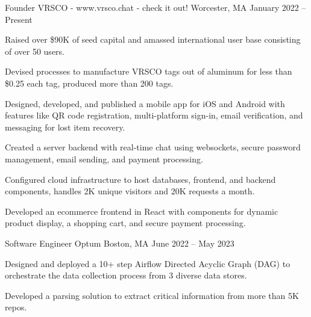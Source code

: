 

\begin{cventries}

  \cventry
    {Founder} %
    {VRSCO - www.vrsco.chat - check it out!} %
    {Worcester, MA} %
    {January 2022 – Present}
    {
      \begin{cvitems} %
      \item {Raised over \$90K of seed capital and amassed international user base consisting of over 50 users.}
      \item {Devised processes to manufacture VRSCO tags out of aluminum for less than \$0.25 each tag, produced more than 200 tags.}
      \item {Designed, developed, and published a mobile app for iOS and Android with features like QR code registration, multi-platform sign-in, email verification, and messaging for lost item recovery.}
      \item {Created a server backend with real-time chat using websockets, secure password management, email sending, and payment processing.}
      \item {Configured cloud infrastructure to host databases, frontend, and backend components, handles 2K unique visitors and 20K requests a month.}
      \item {Developed an ecommerce frontend in React with components for dynamic product display, a shopping cart, and secure payment processing.}
      \end{cvitems}
    }
  \cventry
    {Software Engineer} %
    {Optum} %
    {Boston, MA} %
    {June 2022 – May 2023} %
    {
      \begin{cvitems} %
        \item {Designed and deployed a 10+ step Airflow Directed Acyclic Graph (DAG) to orchestrate the data collection process from 3 diverse data stores.}
        \item {Developed a parsing solution to extract critical information from more than 5K repos.}

\end{cvitems}}
\end{cventries}
